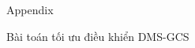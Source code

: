 \documentclass[aspectratio=169]{beamer}
\begin{document}


\begin{frame}{Appendix}
    \begin{center}
        \Huge Bài toán tối ưu điều khiển DMS-GCS
    \end{center}
\end{frame}
\end{document}
